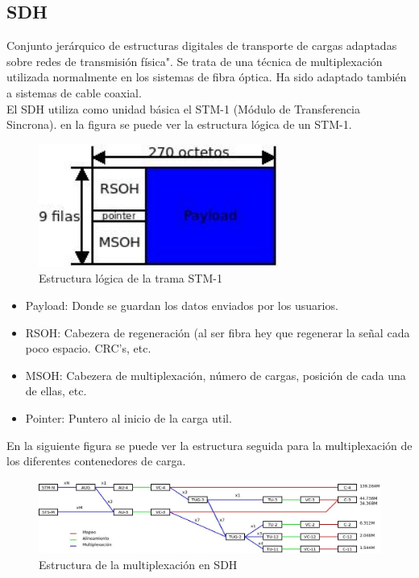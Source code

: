 \subsection{SDH}
Conjunto jerárquico de estructuras digitales de transporte de cargas adaptadas sobre redes de transmisión física". Se trata de una técnica de multiplexación utilizada normalmente en los sistemas de fibra óptica. Ha sido adaptado también a sistemas de cable coaxial.\\
El SDH utiliza como unidad básica el STM-1 (Módulo de Transferencia Sincrona). en la figura se puede ver la estructura lógica de un STM-1.
\begin{figure}[H]
\centering
\includegraphics[width=0.7\textwidth]{Imagen/diaSTM1.jpg}
\caption{Estructura lógica de la trama STM-1}
\label{}
\end{figure}
\begin{itemize}
	\item Payload: Donde se guardan los datos enviados por los usuarios.
	\item RSOH: Cabezera de regeneración (al ser fibra hey que regenerar la señal cada poco espacio. CRC's, etc.
	\item MSOH: Cabezera de multiplexación, número de cargas, posición de cada una de ellas, etc.
	\item Pointer: Puntero al inicio de la carga util.
\end{itemize}
En la siguiente figura se puede ver la estructura seguida para la multiplexación de los diferentes contenedores de carga.
\begin{figure}[H]
\centering
\includegraphics[width=\textwidth]{Imagen/diamuxSDH.jpg}
\caption{Estructura de la multiplexación en SDH}
\label{}
\end{figure}